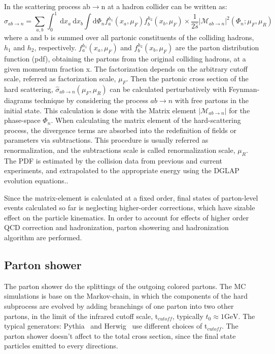 In the scattering process ab$\rightarrow$n at a hadron collider can be written as:
\begin{equation}
\label{eqn:qcdxsec}
\sigma_{a b \rightarrow n}=\sum_{a, b} \int_{0}^{1} \mathrm{~d} x_{a} \mathrm{~d} x_{b} \int \mathrm{d} \Phi_{n} f_{a}^{h_{1}}\left(x_{a}, \mu_{F}\right) f_{b}^{h_{2}}\left(x_{b}, \mu_{F}\right) \times \frac{1}{2 \hat{s}}\left|\mathcal{M}_{a b \rightarrow n}\right|^{2}\left(\Phi_{n} ; \mu_{F}, \mu_{R}\right)
\end{equation}
where a and b is summed over all partonic constituents of the colliding hadrons, $h_1$ and $h_2$, respectively.
$f_{a}^{h_{1}}\left(x_{a}, \mu_{F}\right)$ and $f_{b}^{h_{2}}\left(x_{b}, \mu_{F}\right)$ are the parton distribution function (pdf), obtaining the partons from the original colliding hadrons, at a given momentum fraction x. The factorization depends on the arbitrary cutoff scale, referred as factorization scale, $\mu_F$.
Then the partonic cross section of the hard scattering, $\hat{\sigma}_{a b \rightarrow n}\left(\mu_{F}, \mu_{R}\right)$ can be calculated perturbatively with Feynman-diagrams technique by considering the process $ab\rightarrow n $ with free partons in the initial state. This calculation is done with the Matrix element $\left|\mathcal{M}_{a b \rightarrow n}\right|$ for the phase-space $\Phi_n$.
When calculating the matrix element of the hard-scattering process, the divergence terms are absorbed into the redefinition of fields or parameters via subtractions. This procedure is usually referred as renormalization, and the subtractions scale is called renormalization scale, $\mu_R$. 
The PDF is estimated by the collision data from previous and current experiments, and extrapolated to the appropriate energy using the DGLAP evolution equations.\cite{}.

Since the matrix-element is calculated at a fixed order, final states of parton-level events calculated so far is neglecting higher-order corrections, which have sizable effect on the particle kinematics. In order to account for effects of higher order QCD correction and hadronization, parton showering and hadronization algorithm are performed.

\subsection{Parton shower}
\label{subsec:partonshower}

The parton shower do the splittings of the outgoing colored partons.  The MC simulations is base on the Markov-chain, in which the components of the hard subprocess are evolved by adding branchings of one parton into two other partons, in the limit of the infrared cutoff scale, t$_{cutoff}$, typically $t_{0} \approx 1 \mathrm{GeV}$. The typical generators: Pythia~\cite{SJOSTRAND2008852} and Herwig~\cite{Gieseke2012} use different choices of t$_{cutoff}$.
The parton shower doesn't affect to the total cross section, since the final state particles emitted to every directions.
